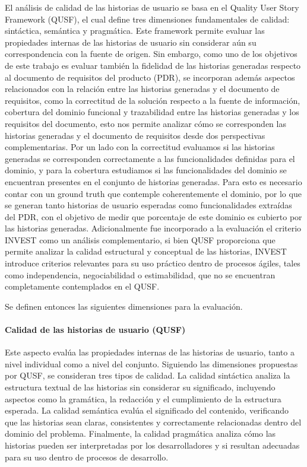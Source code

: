 El análisis de calidad de las historias de usuario se basa en el Quality User Story Framework (QUSF), el cual define tres dimensiones fundamentales de calidad: sintáctica, semántica y pragmática. Este framework permite evaluar las propiedades internas de las historias de usuario sin considerar aún su correspondencia con la fuente de origen.
Sin embargo, como uno de los objetivos de este trabajo es evaluar también la fidelidad de las historias generadas respecto al documento de requisitos del producto (PDR), se incorporan además aspectos relacionados con la relación entre las historias generadas y el documento de requisitos, como la correctitud de la solución respecto a la fuente de información, cobertura del dominio funcional y trazabilidad entre las historias generadas y los requisitos del documento, esto nos permite analizar cómo se corresponden las historias generadas y el documento de requisitos desde dos perspectivas complementarias. Por un lado con la correctitud evaluamos si las historias generadas se corresponden correctamente a las funcionalidades definidas para el dominio, y para la cobertura estudiamos si las funcionalidades del dominio se encuentran presentes en el conjunto de historias generadas. Para esto es necesario contar con un ground truth que contemple coherentemente el dominio, por lo que se generan tanto historias de usuario esperadas como funcionalidades extraídas del PDR, con el objetivo de medir que porcentaje de este dominio es cubierto por las historias generadas.
Adicionalmente fue incorporado a la evaluación el criterio INVEST como un análisis complementario, si bien QUSF proporciona que permite analizar la calidad estructural y conceptual de las historias, INVEST introduce criterios relevantes para su uso práctico dentro de procesos ágiles, tales como independencia, negociabilidad o estimabilidad, que no se encuentran completamente contemplados en el QUSF. 
\newline

Se definen entonces las siguientes dimensiones para la evaluación.
\paragraph{Calidad de las historias de usuario (QUSF)}
Este aspecto evalúa las propiedades internas de las historias de usuario, tanto a nivel individual como a nivel del conjunto. Siguiendo las dimensiones propuestas por QUSF, se consideran tres tipos de calidad. La calidad sintáctica analiza la estructura textual de las historias sin considerar su significado, incluyendo aspectos como la gramática, la redacción y el cumplimiento de la estructura esperada. La calidad semántica evalúa el significado del contenido, verificando que las historias sean claras, consistentes y correctamente relacionadas dentro del dominio del problema. Finalmente, la calidad pragmática analiza cómo las historias pueden ser interpretadas por los desarrolladores y si resultan adecuadas para su uso dentro de procesos de desarrollo.
